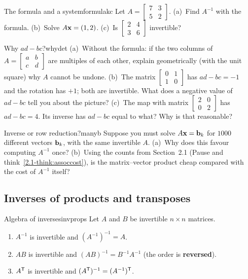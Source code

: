 \documentclass[11pt]{article}
\begin{document}
\begin{kc}{The formula and a system}{formulakc}
Let $A=\begin{bmatrix}7&3\\5&2\end{bmatrix}$. (a)~Find $A^{-1}$ with the formula. (b)~Solve $A\mathbf{x}=(1,2)$. (c)~Is $\begin{bmatrix}2&4\\3&6\end{bmatrix}$ invertible?
\end{kc}

\begin{think}{Why $ad-bc$?}{whydet}
(a)~Without the formula: if the two columns of $A=\begin{bmatrix}a&b\\c&d\end{bmatrix}$ are multiples of each other, explain geometrically (with the unit square) why $A$ cannot be undone. (b)~The matrix $\begin{bmatrix}0&1\\1&0\end{bmatrix}$ has $ad-bc=-1$ and the rotation has $+1$; both are invertible. What does a negative value of $ad-bc$ tell you about the picture? (c)~The map with matrix $\begin{bmatrix}2&0\\0&2\end{bmatrix}$ has $ad-bc=4$. Its inverse has $ad-bc$ equal to what? Why is that reasonable?
\end{think}

\begin{think}{Inverse or row reduction?}{manyb}
Suppose you must solve $A\mathbf{x}=\mathbf{b}_k$ for $1000$ different vectors $\mathbf{b}_k$, with the same invertible $A$. (a)~Why does this favour computing $A^{-1}$ once? (b)~Using the counts from Section~2.1 (Pause and think~\ref{2.1-think:assoccost}), is the matrix--vector product cheap compared with the cost of $A^{-1}$ itself?
\end{think}

\subsection*{Inverses of products and transposes}

\begin{thm}{Algebra of inverses}{invprops}
Let $A$ and $B$ be invertible $n\times n$ matrices.
\begin{enumerate}[label=(\alph*),itemsep=1pt]
  \item $A^{-1}$ is invertible and $(A^{-1})^{-1}=A$.
  \item $AB$ is invertible and $(AB)^{-1}=B^{-1}A^{-1}$ \quad (the order is \textbf{reversed}).
  \item $A^{\mathsf T}$ is invertible and $(A^{\mathsf T})^{-1}=(A^{-1})^{\mathsf T}$.
\end{enumerate}
\end{thm}
\end{document}
